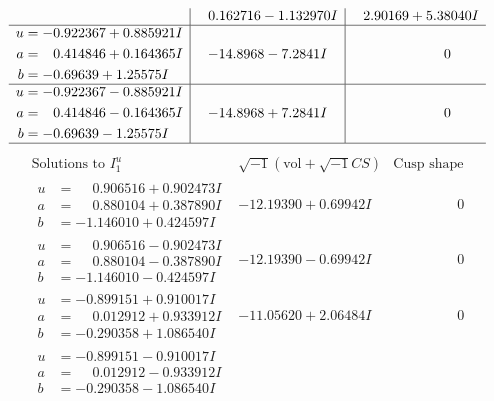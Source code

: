 \documentclass[1p]{elsarticle_modified}
\theoremstyle{definition}
\newcommand{\I}{\sqrt{-1}}
\begin{document}
$$\begin{array}{c|c|c}
 & \phantom{-}0.162716 - 1.132970 I & \phantom{-}2.90169 + 5.38040 I \\ \hline\begin{aligned}
u &= -0.922367 + 0.885921 I \\
a &= \phantom{-}0.414846 + 0.164365 I \\
b &= -0.69639 + 1.25575 I\end{aligned}
 & -14.8968 - 7.2841 I & \phantom{-0.000000 } 0 \\ \hline\begin{aligned}
u &= -0.922367 - 0.885921 I \\
a &= \phantom{-}0.414846 - 0.164365 I \\
b &= -0.69639 - 1.25575 I\end{aligned}
 & -14.8968 + 7.2841 I & \phantom{-0.000000 } 0\\
 \hline 
 \end{array}$$\newpage$$\begin{array}{c|c|c}  
\text{Solutions to }I^u_{1}& \I (\text{vol} + \sqrt{-1}CS) & \text{Cusp shape}\\
 \hline 
\begin{aligned}
u &= \phantom{-}0.906516 + 0.902473 I \\
a &= \phantom{-}0.880104 + 0.387890 I \\
b &= -1.146010 + 0.424597 I\end{aligned}
 & -12.19390 + 0.69942 I & \phantom{-0.000000 } 0 \\ \hline\begin{aligned}
u &= \phantom{-}0.906516 - 0.902473 I \\
a &= \phantom{-}0.880104 - 0.387890 I \\
b &= -1.146010 - 0.424597 I\end{aligned}
 & -12.19390 - 0.69942 I & \phantom{-0.000000 } 0 \\ \hline\begin{aligned}
u &= -0.899151 + 0.910017 I \\
a &= \phantom{-}0.012912 + 0.933912 I \\
b &= -0.290358 + 1.086540 I\end{aligned}
 & -11.05620 + 2.06484 I & \phantom{-0.000000 } 0 \\ \hline\begin{aligned}
u &= -0.899151 - 0.910017 I \\
a &= \phantom{-}0.012912 - 0.933912 I \\
b &= -0.290358 - 1.086540 I\end{aligned}

\end{array}$$
\end{document}
